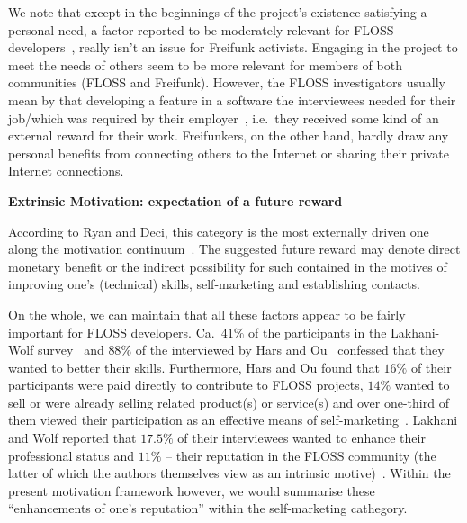 We note that except in the beginnings of the project's existence satisfying a personal need,
a factor reported to be moderately relevant for FLOSS developers~\cite{LakWo2005},
really isn't an issue for Freifunk activists.
Engaging in the project to meet the needs of others seem to be more relevant for members of both communities (FLOSS and Freifunk).
However, the FLOSS investigators usually mean by that developing a feature in a software the interviewees needed for their job/which was required by their employer~\cite{LakWo2005}, i.e.\ they received some kind of an external reward for their work.
Freifunkers, on the other hand, hardly draw any personal benefits from connecting others to the Internet or sharing their private Internet connections.




\textbf{Extrinsic Motivation: expectation of a future reward}

According to Ryan and Deci, this category is the most externally driven one along the motivation continuum~\cite{RyDe2000}.
The suggested future reward may denote direct monetary benefit or the indirect possibility for such contained in the motives of improving one's (technical) skills, self-marketing and establishing contacts.

On the whole, we can maintain that all these factors appear to be fairly important for FLOSS developers.
Ca.\ $41\%$ of the participants in the Lakhani-Wolf survey~\cite{LakWo2005} and $88\%$ of the interviewed by Hars and Ou~\cite{HarOu2002} confessed that they wanted to better their skills.
Furthermore, Hars and Ou found that $16\%$ of their participants were paid directly to contribute to FLOSS projects, $14\%$ wanted to sell or were already selling related product(s) or service(s) and over one-third of them viewed their participation as an effective means of self-marketing~\cite{HarOu2002}.
Lakhani and Wolf reported that $17.5\%$ of their interviewees wanted to enhance their professional status and $11\%$ -- their reputation in the FLOSS community (the latter of which the authors themselves view as an intrinsic motive)~\cite{LakWo2005}.
Within the present motivation framework however, we would summarise these ``enhancements of one's reputation'' within the self-marketing cathegory.


